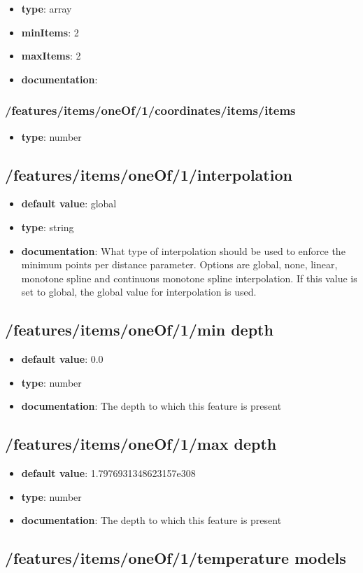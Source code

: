 \begin{itemize}\item {\bf type}: array
\item {\bf minItems}: 2
\item {\bf maxItems}: 2
\item {\bf documentation}: 
\end{itemize}\subsubsection{/features/items/oneOf/1/coordinates/items/items}
\begin{itemize}\item {\bf type}: number
\end{itemize}\subsection{/features/items/oneOf/1/interpolation}
\begin{itemize}\item {\bf default value}: global
\item {\bf type}: string
\item {\bf documentation}: What type of interpolation should be used to enforce the minimum points per distance parameter. Options are global, none, linear, monotone spline and continuous monotone spline interpolation. If this value is set to global, the global value for interpolation is used.
\end{itemize}\subsection{/features/items/oneOf/1/min depth}
\begin{itemize}\item {\bf default value}: 0.0
\item {\bf type}: number
\item {\bf documentation}: The depth to which this feature is present
\end{itemize}\subsection{/features/items/oneOf/1/max depth}
\begin{itemize}\item {\bf default value}: 1.7976931348623157e308
\item {\bf type}: number
\item {\bf documentation}: The depth to which this feature is present
\end{itemize}\subsection{/features/items/oneOf/1/temperature models}
